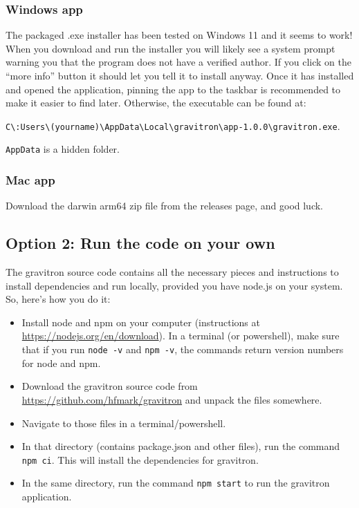 \documentclass{pfpe-manual}
\begin{document}
\subsubsection{Windows app}
The packaged .exe installer has been tested on Windows 11 and it seems to work! When you download and run the installer you will likely see a system prompt warning you that the program does not have a verified author. If you click on the ``more info'' button it should let you tell it to install anyway. Once it has installed and opened the application, pinning the app to the taskbar is recommended to make it easier to find later. Otherwise, the executable can be found at: 

\texttt{C\textbackslash :Users\textbackslash (yourname)\textbackslash AppData\textbackslash Local\textbackslash gravitron\textbackslash app-1.0.0\textbackslash gravitron.exe}. 

\noindent \texttt{AppData} is a hidden folder.

\subsubsection{Mac app}
Download the darwin arm64 zip file from the releases page, and good luck.

\subsection{Option 2: Run the code on your own}
\label{runwithnode}
The gravitron source code contains all the necessary pieces and instructions to install dependencies and run locally, provided you have node.js on your system. So, here's how you do it:
\begin{itemize}
    \item Install node and npm on your computer (instructions at \url{https://nodejs.org/en/download}). In a terminal (or powershell), make sure that if you run \texttt{node -v} and \texttt{npm -v}, the commands return version numbers for node and npm.
    \item Download the gravitron source code from \url{https://github.com/hfmark/gravitron} and unpack the files somewhere.
    \item Navigate to those files in a terminal/powershell.
    \item In that directory (contains package.json and other files), run the command \texttt{npm ci}. This will install the dependencies for gravitron.
    \item In the same directory, run the command \texttt{npm start} to run the gravitron application. 
\end{itemize}
\end{document}
